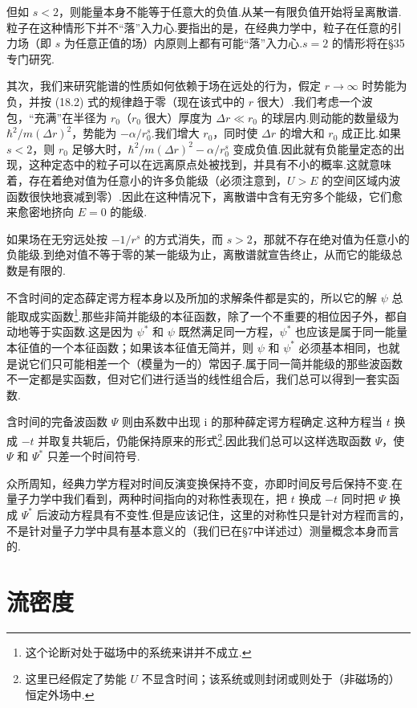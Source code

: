 但如 $s<2$，则能量本身不能等于任意大的负值.从某一有限负值开始将呈离散谱.粒子在这种情形下并不“落”入力心.要指出的是，在经典力学中，粒子在任意的引力场（即 $s$ 为任意正值的场）内原则上都有可能“落”入力心.$s=2$ 的情形将在§35专门研究.

其次，我们来研究能谱的性质如何依赖于场在远处的行为，假定 $r\to\infty$ 时势能为负，并按 (18.2) 式的规律趋于零（现在该式中的 $r$ 很大）.我们考虑一个波包，“充满”在半径为 $r_0$（$r_0$ 很大）厚度为 $\Delta r\ll r_0$ 的球层内.则动能的数量级为 $\hbar^2/m(\Delta r)^2$，势能为 $-\alpha/r_0^s$.我们增大 $r_0$，同时使 $\Delta r$ 的增大和 $r_0$ 成正比.如果 $s<2$，则 $r_0$ 足够大时，$\hbar^2/m(\Delta r)^2-\alpha/r_0^s$ 变成负值.因此就有负能量定态的出现，这种定态中的粒子可以在远离原点处被找到，并具有不小的概率.这就意味着，存在着绝对值为任意小的许多负能级（必须注意到，$U>E$ 的空间区域内波函数很快地衰减到零）.因此在这种情况下，离散谱中含有无穷多个能级，它们愈来愈密地挤向 $E=0$ 的能级.

如果场在无穷远处按 $-1/r^s$ 的方式消失，而 $s>2$，那就不存在绝对值为任意小的负能级.到绝对值不等于零的某一能级为止，离散谱就宣告终止，从而它的能级总数是有限的.

不含时间的定态薛定谔方程本身以及所加的求解条件都是实的，所以它的解 $\psi$ 总能取成实函数\footnote{这个论断对处于磁场中的系统来讲并不成立.}.那些非简并能级的本征函数，除了一个不重要的相位因子外，都自动地等于实函数.这是因为 $\psi^*$ 和 $\psi$ 既然满足同一方程，$\psi^*$ 也应该是属于同一能量本征值的一个本征函数；如果该本征值无简并，则 $\psi$ 和 $\psi^*$ 必须基本相同，也就是说它们只可能相差一个（模量为一的）常因子.属于同一简并能级的那些波函数不一定都是实函数，但对它们进行适当的线性组合后，我们总可以得到一套实函数.

含时间的完备波函数 $\varPsi$ 则由系数中出现 $\mathrm{i}$ 的那种薛定谔方程确定.这种方程当 $t$ 换成 $-t$ 并取复共轭后，仍能保持原来的形式\footnote{这里已经假定了势能 $U$ 不显含时间；该系统或则封闭或则处于（非磁场的）恒定外场中.}.因此我们总可以这样选取函数 $\varPsi$，使 $\varPsi$ 和 $\varPsi^*$ 只差一个时间符号.

众所周知，经典力学方程对时间反演变换保持不变，亦即时间反号后保持不变.在量子力学中我们看到，两种时间指向的对称性表现在，把 $t$ 换成 $-t$ 同时把 $\varPsi$ 换成 $\varPsi^*$ 后波动方程具有不变性.但是应该记住，这里的对称性只是针对方程而言的，不是针对量子力学中具有基本意义的（我们已在§7中详述过）测量概念本身而言的.

\section{流密度}

